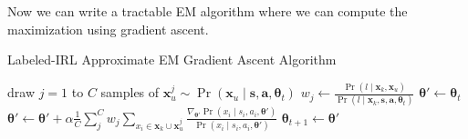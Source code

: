 {Now we can write a tractable EM algorithm where we can compute the maximization using gradient ascent.

\begin{algorithm}
\caption{Labeled-IRL Approximate EM Gradient Ascent Algorithm}
\begin{algorithmic}
\State draw $j =1$ to $C$ samples of $\bm{x}_u^j \sim \Pr(\bm{x}_u \mid \bm{s}, \bm{a}, \bm{\theta}_t)$ 
\State $w_j \gets \frac{\Pr(l \mid \bm{x}_k, \bm{x}_u)}{\Pr(l \mid \bm{x}_k, \bm{s}, \bm{a}, \bm{\theta}_t)}$ 
\EndFor
\State $\bm{\theta}' \gets \bm{\theta}_t$
 
\State $\bm{\theta}' \gets \bm{\theta}' + \alpha \frac{1}{C} \sum_j^C w_j \sum_{x_i \in \bm{x}_k \cup \bm{x}_u^j} \frac{\nabla_{\bm{\theta}'} \Pr(x_i \mid s_i, a_i, \bm{\theta}')}{\Pr(x_i \mid s_i, a_i, \bm{\theta}')} $
\EndFor
\State $\bm{\theta}_{t+1} \gets \bm{\theta}'$
\EndFor
\end{algorithmic}
\end{algorithm}
}
